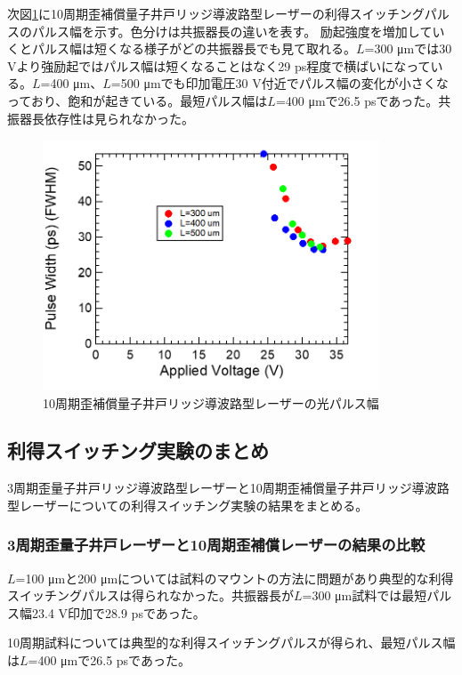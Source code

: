 {{次図\ref{fig:fig_3_2_10QW_ridge_GS_FWHM}に10周期歪補償量子井戸リッジ導波路型レーザーの利得スイッチングパルスのパルス幅を示す。色分けは共振器長の違いを表す。
励起強度を増加していくとパルス幅は短くなる様子がどの共振器長でも見て取れる。$L$=300 \si{\micro\metre}では30 Vより強励起ではパルス幅は短くなることはなく29 ps程度で横ばいになっている。$L$=400 \si{\micro\metre}、$L$=500 \si{\micro\metre}でも印加電圧30 V付近でパルス幅の変化が小さくなっており、飽和が起きている。最短パルス幅は$L$=400 \si{\micro\metre}で26.5 psであった。共振器長依存性は見られなかった。
\begin{figure}[h]
	\centering
	\includegraphics[width=10cm]{figure/fig_3_2_10QW_ridge_GS_FWHM.png}
		\caption{10周期歪補償量子井戸リッジ導波路型レーザーの光パルス幅}
		\label{fig:fig_3_2_10QW_ridge_GS_FWHM}
\end{figure}

\subsection{利得スイッチング実験のまとめ}%

3周期歪量子井戸リッジ導波路型レーザーと10周期歪補償量子井戸リッジ導波路型レーザーについての利得スイッチング実験の結果をまとめる。


\subsubsection{3周期歪量子井戸レーザーと10周期歪補償レーザーの結果の比較}
$L$=100 \si{\micro\metre}と200 \si{\micro\metre}については試料のマウントの方法に問題があり典型的な利得スイッチングパルスは得られなかった。共振器長が$L$=300 \si{\micro\metre}試料では最短パルス幅23.4 V印加で28.9 psであった。

10周期試料については典型的な利得スイッチングパルスが得られ、最短パルス幅は$L$=400 \si{\micro\metre}で26.5 psであった。

}}
